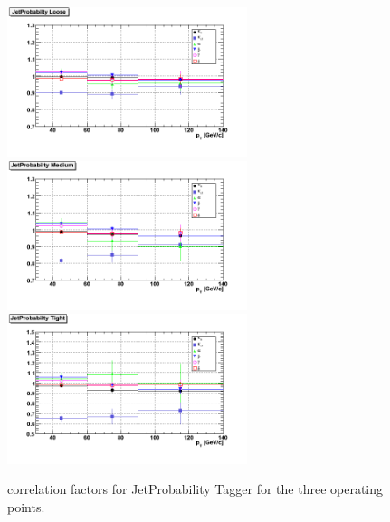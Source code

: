 \begin{figure}[htbp]
  \begin{center}
    \includegraphics[width=70mm]{Figures/JPL_correlations_ppmux.png}
    \includegraphics[width=70mm]{Figures/JPM_correlations_ppmux.png}
    \includegraphics[width=70mm]{Figures/JPT_correlations_ppmux.png}
  \end{center}
  \caption{correlation factors for JetProbability Tagger for the three operating points.}
  \label{fig:correlation_TP}
\end{figure}


